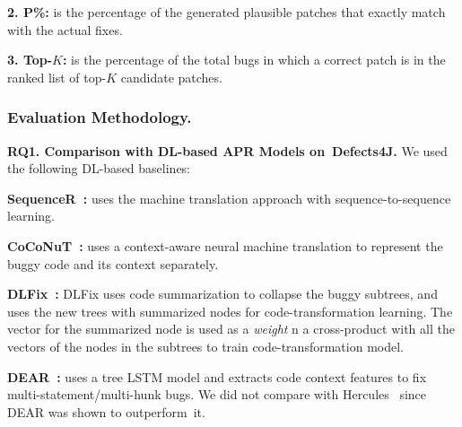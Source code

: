 {\bf 2. P\%:} is the percentage of the generated plausible patches
that exactly match with the actual fixes.

{\bf 3. Top-$K$:} is the percentage of the total bugs in which a correct
patch is in the ranked list of top-$K$ candidate patches.

\subsubsection{Evaluation Methodology.\\}

{\bf RQ1. Comparison with DL-based APR Models on~Defects4J.}  We used
the following DL-based baselines:



{\bf SequenceR~\cite{chen2018sequencer}: } uses the machine
translation approach with sequence-to-sequence learning.

{\bf CoCoNuT~\cite{lutellier2020coconut}:} uses a context-aware neural
machine translation to represent the buggy code and its
context separately.


{\bf DLFix~\cite{icse20}:}
DLFix uses code summarization to collapse the buggy subtrees, and uses the
new trees with summarized nodes for code-transformation learning.
The vector for the summarized node is used as a {\em weight}
n a cross-product with all the vectors of the nodes in the subtrees to
train code-transformation model.

{\bf DEAR~\cite{icse22}:} uses a tree LSTM model
and extracts code context features to fix multi-statement/multi-hunk
bugs. We did not compare with Hercules~\cite{10.1109/ICSE.2019.00020} since
DEAR was shown to outperform~it.

